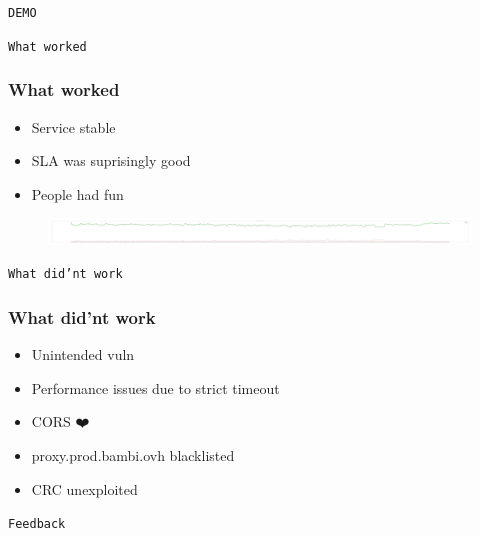 \documentclass[10pt]{beamer}
\begin{document}
\begin{frame}
	\begin{center}
		\LARGE{\texttt{DEMO}}
	\end{center}
\end{frame}

\begin{frame}
	\begin{center}
		\LARGE{\texttt{What worked}}
	\end{center}
\end{frame}

\begin{frame}
	\frametitle{What worked}
	\begin{itemize}
		\item<1-> Service stable
		\item<2-> SLA was suprisingly good
		\item<3-> People had fun
	\end{itemize}
	\pause
	\pause
	\begin{figure}
		\includegraphics[scale=.018]{replme-performance}
	\end{figure}
\end{frame}

\begin{frame}
	\begin{center}
		\LARGE{\texttt{What did'nt work}}
	\end{center}
\end{frame}

\begin{frame}
	\frametitle{What did'nt work}
	\begin{itemize}
		\item<1-> Unintended vuln
		\item<2-> Performance issues due to strict timeout
		\item<3-> CORS ❤️
		\item<4-> proxy.prod.bambi.ovh blacklisted
		\item<5-> CRC unexploited
	\end{itemize}
\end{frame}

\begin{frame}
	\begin{center}
		\LARGE{\texttt{Feedback}}
	\end{center}
\end{frame}
\end{document}

